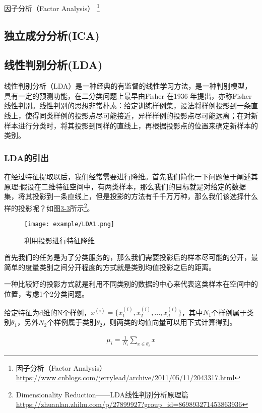 因子分析（Factor Analysis） \footnote{因子分析（Factor Analysis）\quad \url{https://www.cnblogs.com/jerrylead/archive/2011/05/11/2043317.html}}

\subsection{独立成分分析(ICA)}


\subsection{线性判别分析(LDA)}

线性判别分析（LDA）是一种经典的有监督的线性学习方法，是一种判别模型，具有一定的预测功能，在二分类问题上最早由Fisher 在1936 年提出，亦称Fisher线性判别。线性判别的思想非常朴素：给定训练样例集，设法将样例投影到一条直线上，使得同类样例的投影点尽可能接近，异样样例的投影点尽可能远离；在对新样本进行分类时，将其投影到同样的直线上，再根据投影点的位置来确定新样本的类别。

\subsubsection{LDA的引出}

在经过特征提取以后，我们经常需要进行降维。首先我们简化一下问题便于阐述其原理:假设在二维特征空间中，有两类样本，那么我们的目标就是对给定的数据集，将其投影到一条直线上，但是投影的方法有千千万万种，那么我们该选择什么样的投影呢？如图\href{figure:3-3}{3-3}所示\footnote{Dimensionality Reduction——LDA线性判别分析原理篇 \quad \url{https://zhuanlan.zhihu.com/p/27899927?group_id=869893271453863936}}。

\begin{figure}[!htp]
\centering
\texttt{[image: example/LDA1.png]}
\caption{利用投影进行特征降维}
\label{fig1:3-1}
\end{figure}

首先我们的任务是为了分类服务的，那么我们需要投影后的样本尽可能的分开，最简单的度量类别之间分开程度的方式就是类别均值投影之后的距离。

一种比较好的投影方式就是利用不同类别的数据的中心来代表这类样本在空间中的位置，考虑1个2分类问题。

给定特征为d维的N个样例，$x^{(i)} = \{ x_1^{(i)}, x_2^{(i)}, ... , x_d^{(i)}\}$，其中$N_1$个样例属于类别$\theta_1$，另外$N_2$个样例属于类别$\theta_2$，则两类的均值向量可以用下式计算得到。

\begin{eqnarray}
\mu_i = \frac{1}{N_i}\sum_{x \in \theta_i} x
\end{eqnarray}


